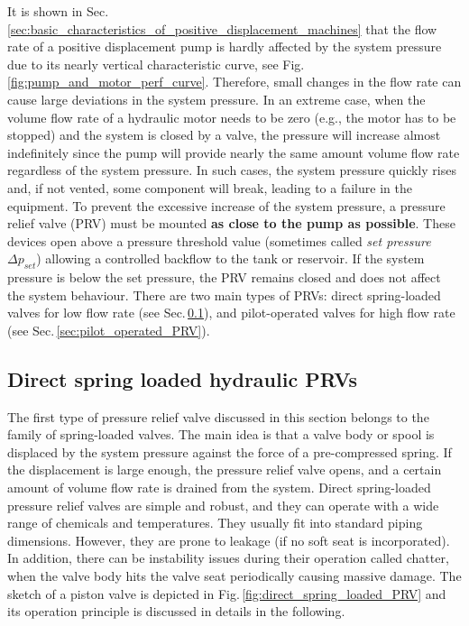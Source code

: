It is shown in Sec.\,\ref{sec:basic_characteristics_of_positive_displacement_machines} that the flow rate of a positive displacement pump is hardly affected by the system pressure due to its nearly vertical characteristic curve, see Fig.\,\ref{fig:pump_and_motor_perf_curve}. Therefore, small changes in the flow rate can cause large deviations in the system pressure. In an extreme case, when the volume flow rate of a hydraulic motor needs to be zero (e.g., the motor has to be stopped) and the system is closed by a valve, the pressure will increase almost indefinitely since the pump will provide nearly the same amount volume flow rate regardless of the system pressure. In such cases, the system pressure quickly rises and, if not vented, some component will break, leading to a failure in the equipment. To prevent the excessive increase of the system pressure, a pressure relief valve (PRV) must be mounted {\bf as close to the pump as possible}. These devices open above a pressure threshold value (sometimes called \emph{set pressure} $\Delta p_{set}$) allowing a controlled backflow to the tank or reservoir. If the system pressure is below the set pressure, the PRV remains closed and does not affect the system behaviour. There are two main types of PRVs: direct spring-loaded valves for low flow rate (see Sec.\,\ref{sec:direct_spring_loaded_hydraulic_PRV}), and pilot-operated valves for high flow rate (see Sec.\,\ref{sec:pilot_operated_PRV}).

\subsection{Direct spring loaded hydraulic PRVs} \label{sec:direct_spring_loaded_hydraulic_PRV}
The first type of pressure relief valve discussed in this section belongs to the family of spring-loaded valves. The main idea is that a valve body or spool is displaced by the system pressure against the force of a pre-compressed spring. If the displacement is large enough, the pressure relief valve opens, and a certain amount of volume flow rate is drained from the system. Direct spring-loaded pressure relief valves are simple and robust, and they can operate with a wide range of chemicals and temperatures. They usually fit into standard piping dimensions. However, they are prone to leakage (if no soft seat is incorporated). In addition, there can be instability issues during their operation called chatter, when the valve body hits the valve seat periodically causing massive damage. The sketch of a piston valve is depicted in Fig.\,\ref{fig:direct_spring_loaded_PRV} and its operation principle is discussed in details in the following.


